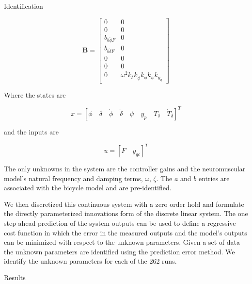 \documentclass[final]{beamer}
\newlength{\onecolwid}
\begin{document}
{\begin{center}
\begin{columns}[t]
\begin{column}{\onecolwid}
\begin{block}{Identification}
{      \begin{equation}
        \mathbf{B}
        =
        \begin{bmatrix}
         0 & 0 \\
         0 & 0 \\
         b_{b\ddot{\phi}F} & 0 \\
         b_{b\ddot{\delta}F} & 0 \\
         0 & 0 \\
         0 & 0 \\
         0 & \omega^2 k_{\delta} k_{\dot{\phi}} k_{\phi} k_{\psi} k_{y_q}
        \end{bmatrix}
      \end{equation}

      Where the states are

      \begin{equation}
        x = \left[ \phi \quad \delta \quad \dot{\phi} \quad \dot{\delta}
        \quad \psi \quad y_p \quad T_\delta \quad \dot{T}_\delta \right]^T
      \end{equation}

      and the inputs are

      \begin{equation}
        u = \left[ F \quad y_{qc} \right]^T
      \end{equation}

      The only unknowns in the system are the controller gains and the
      neuromuscular model's natural frequency and damping terms, $\omega$,
      $\zeta$. The $a$ and $b$ entries are associated with the bicycle model
      and are pre-identified.

      We then discretized this continuous system with a zero order hold and
      formulate the directly parameterized innovations form \cite{Ljung1999} of
      the discrete linear system. The one step ahead prediction of the system
      outputs can be used to define a regressive cost function in which the
      error in the measured outputs and the model's outputs can be minimized
      with respect to the unknown parameters. Given a set of data the unknown
      parameters are identified using the prediction error method. We identify
      the unknown parameters for each of the 262 runs.

    } %
  \end{block}

  \begin{block}{Results}


\end{block}
\end{column}
\end{columns}
\end{center}}
\end{document}
